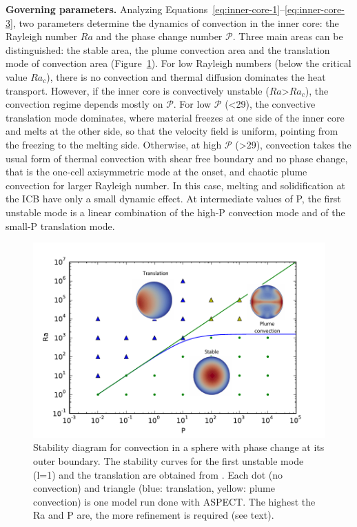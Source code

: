 \documentclass{article}
\begin{document}
\vspace{0.3cm}
\textbf{Governing parameters.}  Analyzing Equations~\eqref{eq:inner-core-1}--\eqref{eq:inner-core-3}, two parameters determine 
the dynamics of convection in the inner core: the Rayleigh number $Ra$ and the phase change number $\mathcal{P}$. 
Three main areas can be distinguished: the stable area, the plume convection area and the translation mode of convection area (Figure~\ref{fig:diagramme-regime}). For low Rayleigh numbers (below the critical value $Ra_c$), there is no convection and thermal diffusion dominates the heat transport. However, if the inner core is convectively unstable ($Ra$>$Ra_c$), the convection regime depends mostly on $\mathcal{P}$. For low $\mathcal{P}$ (<29), the convective translation mode dominates, where material freezes at one side of the inner core and melts at the other side, so that the velocity field is uniform, pointing from the freezing to the melting side. Otherwise, at high $\mathcal{P}$ (>29), convection takes the usual form of thermal convection with shear free boundary and no phase change, that is the one-cell axisymmetric mode at the onset, and chaotic plume convection for larger Rayleigh number. In this case, melting and solidification at the ICB have only a small dynamic effect. At intermediate values of P, the first unstable mode is a linear combination of the high-P convection mode and of the small-P translation mode.


\begin{figure}[h]
\begin{center}
\includegraphics[height=0.57\textwidth]{cookbooks/inner_core_convection/Diagstab.pdf}
	\caption{Stability diagram for convection in a sphere with phase change at its outer boundary. The stability curves for the first unstable mode (l=1) and the translation are obtained from \cite{Deguen2013}. Each dot (no convection) and triangle (blue: translation, yellow: plume convection) is one model run done with ASPECT. The highest the Ra and P are, the more refinement is required (see text).}
    \label{fig:diagramme-regime}
\end{center}
\end{figure}
\end{document}
